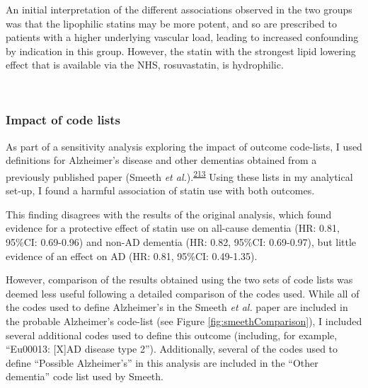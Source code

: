 \documentclass[a4paper, twoside]{templates/ociamthesis}
\begin{document}
An initial interpretation of the different associations observed in the two groups was that the lipophilic statins may be more potent, and so are prescribed to patients with a higher underlying vascular load, leading to increased confounding by indication in this group. However, the statin with the strongest lipid lowering effect that is available via the NHS, rosuvastatin, is hydrophilic.

~

\hypertarget{impact-of-code-lists}{%
\subsubsection{Impact of code lists}\label{impact-of-code-lists}}

As part of a sensitivity analysis exploring the impact of outcome code-lists, I used definitions for Alzheimer's disease and other dementias obtained from a previously published paper (Smeeth \emph{et al.}).\textsuperscript{\protect\hyperlink{ref-smeeth2009}{213}} Using these lists in my analytical set-up, I found a harmful association of statin use with both outcomes.

This finding disagrees with the results of the original analysis, which found evidence for a protective effect of statin use on all-cause dementia (HR: 0.81, 95\%CI: 0.69-0.96) and non-AD dementia (HR: 0.82, 95\%CI: 0.69-0.97), but little evidence of an effect on AD (HR: 0.81, 95\%CI: 0.49-1.35).

However, comparison of the results obtained using the two sets of code lists was deemed less useful following a detailed comparison of the codes used. While all of the codes used to define Alzheimer's in the Smeeth \emph{et al.} paper are included in the probable Alzheimer's code-list (see Figure \ref{fig:smeethComparison}), I included several additional codes used to define this outcome (including, for example, ``Eu00013: {[}X{]}AD disease type 2''). Additionally, several of the codes used to define ``Possible Alzheimer's'' in this analysis are included in the ``Other dementia'' code list used by Smeeth.

~
\end{document}
